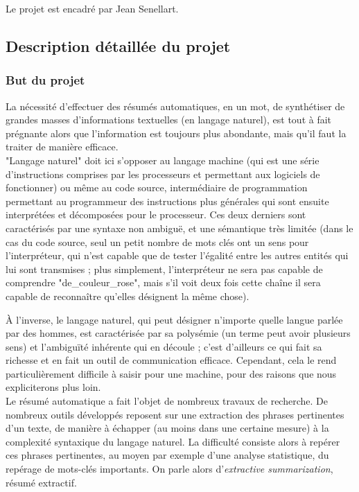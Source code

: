 \documentclass[a4paper, 12pt]{article}
\begin{document}
Le projet est encadré par Jean Senellart.

\subsection{Description détaillée du projet}

\subsubsection{But du projet}

La nécessité d'effectuer des résumés automatiques, en un mot, de synthétiser de grandes masses d'informations textuelles (en langage naturel), est tout à fait prégnante alors que l'information est toujours plus abondante, mais qu'il faut la traiter de manière efficace.\\

"Langage naturel" doit ici s'opposer au langage machine (qui est une série d'instructions comprises par les processeurs et permettant aux logiciels de fonctionner) ou même au code source, intermédiaire de programmation permettant au programmeur des instructions plus générales qui sont ensuite interprétées et décomposées pour le processeur. Ces deux derniers sont caractérisés par une syntaxe non ambiguë, et une sémantique très limitée (dans le cas du code source, seul un petit nombre de mots clés ont un sens pour l'interpréteur, qui n'est capable que de tester l'égalité entre les autres entités qui lui sont transmises ; plus simplement, l'interpréteur ne sera pas capable de comprendre "de\_couleur\_rose", mais s'il voit deux fois cette chaîne il sera capable de reconnaître qu'elles désignent la même chose).

À l'inverse, le langage naturel, qui peut désigner n'importe quelle langue parlée par des hommes, est caractérisée par sa polysémie (un terme peut avoir plusieurs sens) et l'ambiguïté inhérente qui en découle ; c'est d'ailleurs ce qui fait sa richesse et en fait un outil de communication efficace. Cependant, cela le rend particulièrement difficile à saisir pour une machine, pour des raisons que nous expliciterons plus loin.\\

Le résumé automatique a fait l'objet de nombreux travaux de recherche. De nombreux outils développés reposent sur une extraction des phrases pertinentes d'un texte, de manière à échapper (au moins dans une certaine mesure) à la complexité syntaxique du langage naturel. La difficulté consiste alors à repérer ces phrases pertinentes, au moyen par exemple d'une analyse statistique, du repérage de mots-clés importants. On parle alors d'\textit{extractive summarization}, résumé extractif.\\
\end{document}
